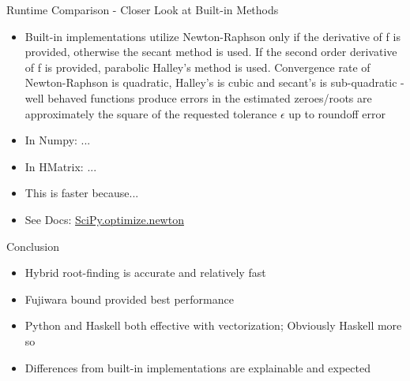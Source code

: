 \documentclass{beamer}
\begin{document}
\begin{frame}{Runtime Comparison - Closer Look at Built-in Methods}
\begin{itemize}
    \item Built-in implementations utilize Newton-Raphson only if the derivative of f is provided, otherwise the secant method is used. If the second order derivative of f is provided, parabolic Halley's method is used.
    \subitem Convergence rate of Newton-Raphson is quadratic, Halley's is cubic and secant's is sub-quadratic - well behaved functions produce errors in the estimated zeroes/roots are approximately the square of the requested tolerance $\epsilon $ up to roundoff error
    \item In Numpy: ...
    \item In HMatrix: ...
    \item This is faster because...
    \item See Docs: \href{https://docs.scipy.org/doc/scipy-0.14.0/reference/generated/scipy.optimize.newton.html}{SciPy.optimize.newton}
\end{itemize}
\end{frame}

\begin{frame}{Conclusion}
\begin{itemize}
    \item Hybrid root-finding is accurate and relatively fast
    \item Fujiwara bound provided best performance
    \item Python and Haskell both effective with vectorization; Obviously Haskell more so
    \item Differences from built-in implementations are explainable and expected
\end{itemize}
\end{frame}
\end{document}
